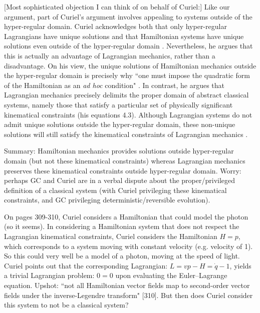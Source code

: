 \documentclass[letterpaper]{article}
\begin{document}
[Most sophisticated objection I can think of on behalf of Curiel:] Like our argument, part of Curiel's argument involves appealing to systems outside of the hyper-regular domain. Curiel acknowledges both that only hyper-regular Lagrangians have unique solutions and that Hamiltonian systems have unique solutions even outside of the hyper-regular domain \parencites*[291, 308]{Curiel}. Nevertheless, he argues that this is actually an advantage of Lagrangian mechanics, rather than a disadvantage. On his view, the unique solutions of Hamiltonian mechanics outside the hyper-regular domain is precisely why ``one must impose the quadratic form of the Hamiltonian as an \textit{ad hoc} condition" \parencites*[308]{Curiel}. In contrast, he argues that Lagrangian mechanics precisely delimits the proper domain of abstract classical systems, namely those that satisfy a particular set of physically significant kinematical constraints (his equations 4.3). Although Lagrangian systems do not admit unique solutions outside the hyper-regular domain, these non-unique solutions will still satisfy the kinematical constraints of Lagrangian mechanics \parencites*[311]{Curiel}. 

Summary: Hamiltonian mechanics provides solutions outside hyper-regular domain (but not these kinematical constraints) whereas Lagrangian mechanics preserves these kinematical constraints outside hyper-regular domain. Worry: perhaps GC and Curiel are in a verbal dispute about the proper/privileged definition of a classical system (with Curiel privileging these kinematical constraints, and GC privileging deterministic/reversible evolution).

On pages 309-310, Curiel considers a Hamiltonian that could model the photon (so it seems). In considering a Hamiltonian system that does not respect the Lagrangian kinematical constraints, Curiel considers the Hamiltonian $H=p$, which corresponds to a system moving with constant velocity (e.g. velocity of 1). So this could very well be a model of a photon, moving at the speed of light. Curiel points out that the corresponding Lagrangian: $L= vp - H = \dot{q}-1$, yields a trivial Lagrangian problem: $0=0$ upon evaluating the Euler--Lagrange equation. Upshot: ``not all Hamiltonian vector fields map to second-order vector fields under the inverse-Legendre transform" [310]. But then does Curiel consider this system to not be a classical system?
\end{document}
